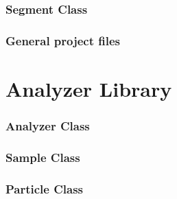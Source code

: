 \documentclass[11pt,fleqn,,a4paper,twoside,openright]{book}
\begin{document}
\subsection*{Segment Class}


\newpage
\subsection*{General project files}









\chapter{Analyzer Library}
\subsection*{Analyzer Class}


\newpage
\subsection*{Sample Class}


\newpage
\subsection*{Particle Class}


\newpage
\end{document}

